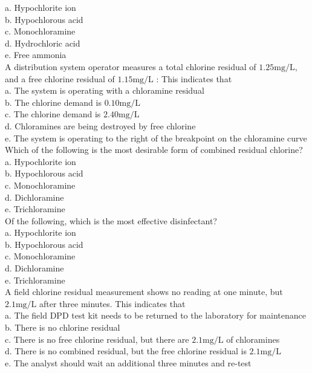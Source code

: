 a. Hypochlorite ion\\
b. Hypochlorous acid\\
c. Monochloramine\\
d. Hydrochloric acid\\
e. Free ammonia\\
 A distribution system operator measures a total chlorine residual of $1.25 \mathrm{mg} / \mathrm{L}$, and a free chlorine residual of $1.15 \mathrm{mg} / \mathrm{L}$ : This indicates that\\
a. The system is operating with a chloramine residual\\
b. The chlorine demand is $0.10 \mathrm{mg} / \mathrm{L}$\\
c. The chlorine demand is $2.40 \mathrm{mg} / \mathrm{L}$\\
d. Chloramines are being destroyed by free chlorine\\
e. The system is operating to the right of the breakpoint on the chloramine curve\\
 Which of the following is the most desirable form of combined residual chlorine?\\
a. Hypochlorite ion\\
b. Hypochlorous acid\\
c. Monochloramine\\
d. Dichloramine\\
e. Trichloramine\\
  Of the following, which is the most effective disinfectant?\\
a. Hypochlorite ion\\
b. Hypochlorous acid\\
c. Monochloramine\\
d. Dichloramine\\
e. Trichloramine\\
  A field chlorine residual measurement shows no reading at one minute, but $2.1 \mathrm{mg} / \mathrm{L}$ after three minutes. This indicates that\\
a. The field DPD test kit needs to be returned to the laboratory for maintenance\\
b. There is no chlorine residual\\
c. There is no free chlorine residual, but there are $2.1 \mathrm{mg} / \mathrm{L}$ of chloramines\\
d. There is no combined residual, but the free chlorine residual is $2.1 \mathrm{mg} / \mathrm{L}$\\
e. The analyst should wait an additional three minutes and re-test\\
